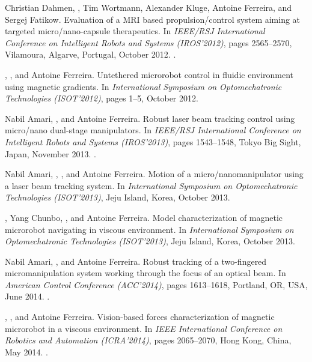 \begin{Mybibliography}{10}
  
  Christian Dahmen, \DavidFolio, Tim Wortmann, Alexander Kluge, Antoine Ferreira,
  and Sergej Fatikow.
  \newblock Evaluation of a {MRI} based propulsion/control system aiming at
  targeted micro/nano-capsule therapeutics.
  \newblock In \emph{IEEE/RSJ International Conference on Intelligent Robots and
    Systems (IROS'2012)}, pages 2565--2570, Vilamoura, Algarve, Portugal, October
  2012.
  \newblock {}.
    
  \KBelharet, \DavidFolio, and Antoine Ferreira.
  \newblock Untethered microrobot control in fluidic environment using magnetic
  gradients.
  \newblock In \emph{International Symposium on Optomechatronic Technologies
    (ISOT'2012)}, pages 1--5, October 2012{}.
  
  
  Nabil Amari, \DavidFolio, and Antoine Ferreira.
  \newblock Robust laser beam tracking control using micro/nano dual-stage
  manipulators.
  \newblock In \emph{IEEE/RSJ International Conference on Intelligent Robots and
    Systems (IROS'2013)}, pages 1543--1548, Tokyo Big Sight, Japan, November
  2013{}.
  \newblock {}.
  
  
  Nabil Amari, \DavidFolio, \KBelharet, and Antoine Ferreira.
  \newblock Motion of a micro/nanomanipulator using a laser beam tracking system.
  \newblock In \emph{International Symposium on Optomechatronic Technologies
    (ISOT'2013)}, Jeju Island, Korea, October 2013{}.
  

  \KBelharet, Yang Chunbo, \DavidFolio, and Antoine Ferreira.
  \newblock Model characterization of magnetic microrobot navigating in viscous
  environment.
  \newblock In \emph{International Symposium on Optomechatronic Technologies
    (ISOT'2013)}, Jeju Island, Korea, October 2013{}.
  
  Nabil Amari, \DavidFolio, and Antoine Ferreira.
  \newblock Robust tracking of a two-fingered micromanipulation system working
  through the focus of an optical beam.
  \newblock In \emph{American Control Conference (ACC'2014)}, pages 1613--1618,
  Portland, OR, USA, June 2014{}.
  \newblock {}.
  
  \KBelharet, \DavidFolio, and Antoine Ferreira.
  \newblock Vision-based forces characterization of magnetic microrobot in a
  viscous environment.
  \newblock In \emph{IEEE International Conference on Robotics and Automation
    (ICRA'2014)}, pages 2065--2070, Hong Kong, China, May 2014{}.
  \newblock {}.
  

\end{Mybibliography}
